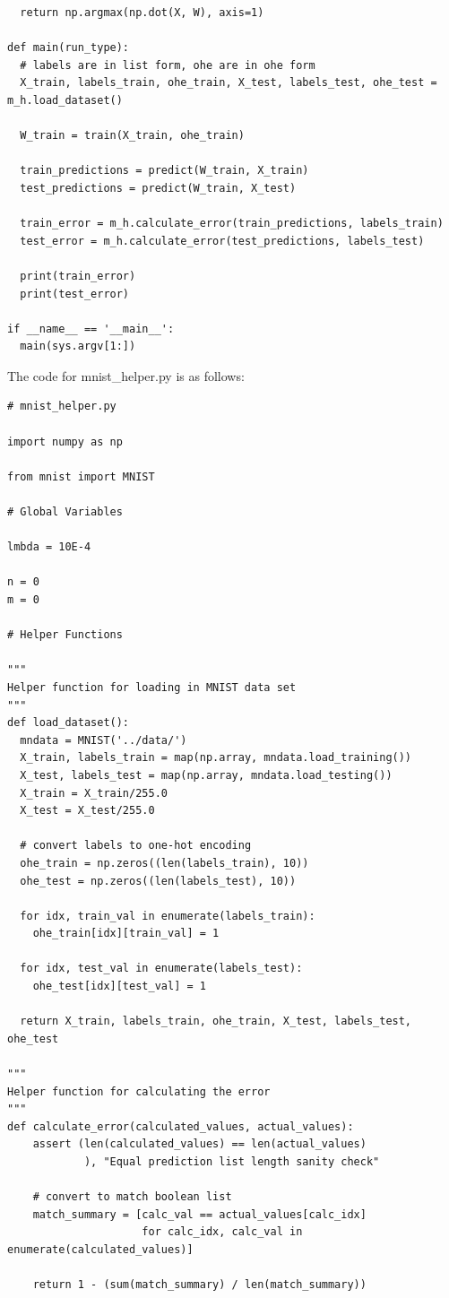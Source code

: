 \documentclass{article}
\newcommand{\1}{\mathbf{1}}
\begin{document}
{\begin{verbatim}
  return np.argmax(np.dot(X, W), axis=1)

def main(run_type):
  # labels are in list form, ohe are in ohe form
  X_train, labels_train, ohe_train, X_test, labels_test, ohe_test = m_h.load_dataset()

  W_train = train(X_train, ohe_train)
  
  train_predictions = predict(W_train, X_train)
  test_predictions = predict(W_train, X_test)

  train_error = m_h.calculate_error(train_predictions, labels_train)
  test_error = m_h.calculate_error(test_predictions, labels_test)

  print(train_error)
  print(test_error)

if __name__ == '__main__':
  main(sys.argv[1:])

\end{verbatim}
The code for mnist\_helper.py is as follows: \\ 

\begin{verbatim}
# mnist_helper.py

import numpy as np

from mnist import MNIST

# Global Variables

lmbda = 10E-4

n = 0
m = 0

# Helper Functions

"""
Helper function for loading in MNIST data set
"""
def load_dataset():
  mndata = MNIST('../data/')
  X_train, labels_train = map(np.array, mndata.load_training())
  X_test, labels_test = map(np.array, mndata.load_testing())
  X_train = X_train/255.0
  X_test = X_test/255.0

  # convert labels to one-hot encoding
  ohe_train = np.zeros((len(labels_train), 10))
  ohe_test = np.zeros((len(labels_test), 10))

  for idx, train_val in enumerate(labels_train):
    ohe_train[idx][train_val] = 1

  for idx, test_val in enumerate(labels_test):
    ohe_test[idx][test_val] = 1

  return X_train, labels_train, ohe_train, X_test, labels_test, ohe_test

"""
Helper function for calculating the error
"""
def calculate_error(calculated_values, actual_values):
    assert (len(calculated_values) == len(actual_values)
            ), "Equal prediction list length sanity check"
    
    # convert to match boolean list
    match_summary = [calc_val == actual_values[calc_idx]
                     for calc_idx, calc_val in enumerate(calculated_values)]

    return 1 - (sum(match_summary) / len(match_summary))


\end{verbatim}

}
\end{document}
